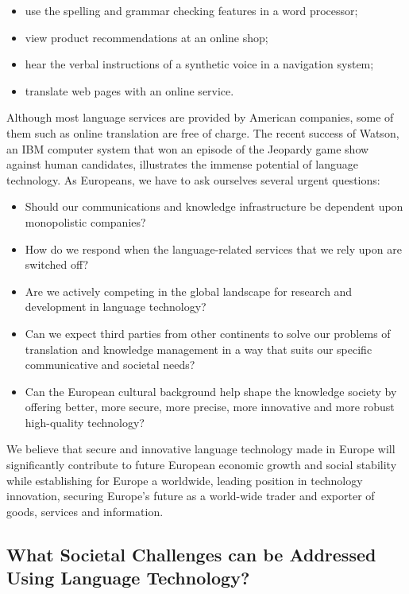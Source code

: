 \documentclass[10pt, plain]{../../metanetpaper}
\begin{document}
\begin{multicols}{2}
\begin{itemize}
\item use the spelling and grammar checking features in a word processor;
\item view product recommendations at an online shop;
\item hear the verbal instructions of a synthetic voice in a navigation system;
\item translate web pages with an online service. 
\end{itemize}

Although most language services are provided by American companies, some of them such as online translation are free of charge. The recent success of Watson, an IBM computer system that won an episode of the Jeopardy game show against human candidates, illustrates the immense potential of language technology. As Europeans, we have to ask ourselves several urgent questions:

\begin{itemize}
\item Should our communications and knowledge infrastructure be dependent upon monopolistic companies?
\item How do we respond when the language-related services that we rely upon are switched off?
\item Are we actively competing in the global landscape for research and development in language technology?
\item Can we expect third parties from other continents to solve our problems of translation and knowledge management in a way that suits our specific communicative and societal needs?
\item Can the European cultural background help shape the knowledge society by offering better, more secure, more precise, more innovative and more robust high-quality technology?
\end{itemize}

We believe that secure and innovative language technology made in Europe will significantly contribute to future European economic growth and social stability while establishing for Europe a worldwide, leading position in technology innovation, securing Europe's future as a world-wide trader and exporter of goods, services and information.

\subsection{What Societal Challenges can be Addressed Using Language Technology?}
\label{sec:what-soci-challenges}


\end{multicols}
\end{document}
